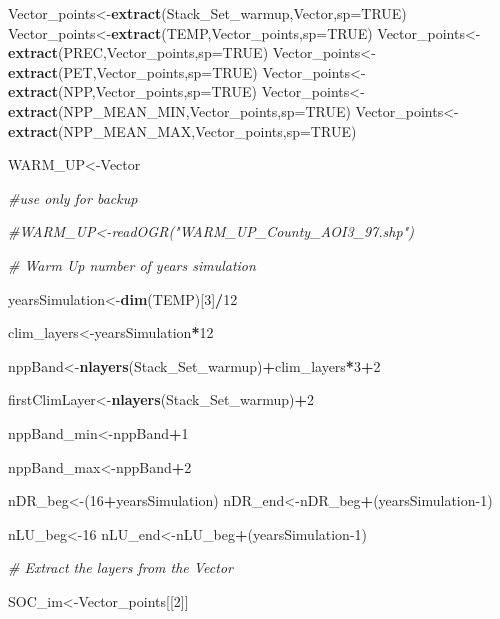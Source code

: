\documentclass[
  10pt,
  b5paper,
]{book}
\newenvironment{Shaded}{\begin{snugshade}}{\end{snugshade}}
\newcommand{\CommentTok}[1]{\textcolor[rgb]{0.56,0.35,0.01}{\textit{#1}}}
\newcommand{\DataTypeTok}[1]{\textcolor[rgb]{0.13,0.29,0.53}{#1}}
\newcommand{\DecValTok}[1]{\textcolor[rgb]{0.00,0.00,0.81}{#1}}
\newcommand{\KeywordTok}[1]{\textcolor[rgb]{0.13,0.29,0.53}{\textbf{#1}}}
\newcommand{\NormalTok}[1]{#1}
\newcommand{\OperatorTok}[1]{\textcolor[rgb]{0.81,0.36,0.00}{\textbf{#1}}}
\newcommand{\OtherTok}[1]{\textcolor[rgb]{0.56,0.35,0.01}{#1}}
\begin{document}
\begin{Shaded}
\begin{Highlighting}[]
\NormalTok{Vector_points<-}\KeywordTok{extract}\NormalTok{(Stack_Set_warmup,Vector,}\DataTypeTok{sp=}\OtherTok{TRUE}\NormalTok{)}
\NormalTok{Vector_points<-}\KeywordTok{extract}\NormalTok{(TEMP,Vector_points,}\DataTypeTok{sp=}\OtherTok{TRUE}\NormalTok{)}
\NormalTok{Vector_points<-}\KeywordTok{extract}\NormalTok{(PREC,Vector_points,}\DataTypeTok{sp=}\OtherTok{TRUE}\NormalTok{)}
\NormalTok{Vector_points<-}\KeywordTok{extract}\NormalTok{(PET,Vector_points,}\DataTypeTok{sp=}\OtherTok{TRUE}\NormalTok{)}
\NormalTok{Vector_points<-}\KeywordTok{extract}\NormalTok{(NPP,Vector_points,}\DataTypeTok{sp=}\OtherTok{TRUE}\NormalTok{)}
\NormalTok{Vector_points<-}\KeywordTok{extract}\NormalTok{(NPP_MEAN_MIN,Vector_points,}\DataTypeTok{sp=}\OtherTok{TRUE}\NormalTok{)}
\NormalTok{Vector_points<-}\KeywordTok{extract}\NormalTok{(NPP_MEAN_MAX,Vector_points,}\DataTypeTok{sp=}\OtherTok{TRUE}\NormalTok{)}

\NormalTok{WARM_UP<-Vector}

\CommentTok{#use only for backup}

\CommentTok{#WARM_UP<-readOGR("WARM_UP_County_AOI3_97.shp")}

\CommentTok{# Warm Up number of years simulation }

\NormalTok{yearsSimulation<-}\KeywordTok{dim}\NormalTok{(TEMP)[}\DecValTok{3}\NormalTok{]}\OperatorTok{/}\DecValTok{12}

\NormalTok{clim_layers<-yearsSimulation}\OperatorTok{*}\DecValTok{12}

\NormalTok{nppBand<-}\KeywordTok{nlayers}\NormalTok{(Stack_Set_warmup)}\OperatorTok{+}\NormalTok{clim_layers}\OperatorTok{*}\DecValTok{3}\OperatorTok{+}\DecValTok{2}

\NormalTok{firstClimLayer<-}\KeywordTok{nlayers}\NormalTok{(Stack_Set_warmup)}\OperatorTok{+}\DecValTok{2}

\NormalTok{nppBand_min<-nppBand}\OperatorTok{+}\DecValTok{1}

\NormalTok{nppBand_max<-nppBand}\OperatorTok{+}\DecValTok{2}

\NormalTok{nDR_beg<-(}\DecValTok{16}\OperatorTok{+}\NormalTok{yearsSimulation)}
\NormalTok{nDR_end<-nDR_beg}\OperatorTok{+}\NormalTok{(yearsSimulation}\DecValTok{-1}\NormalTok{)}

\NormalTok{nLU_beg<-}\DecValTok{16}
\NormalTok{nLU_end<-nLU_beg}\OperatorTok{+}\NormalTok{(yearsSimulation}\DecValTok{-1}\NormalTok{)}

\CommentTok{# Extract the layers from the Vector}

\NormalTok{SOC_im<-Vector_points[[}\DecValTok{2}\NormalTok{]] }


\end{Highlighting}
\end{Shaded}
\end{document}
